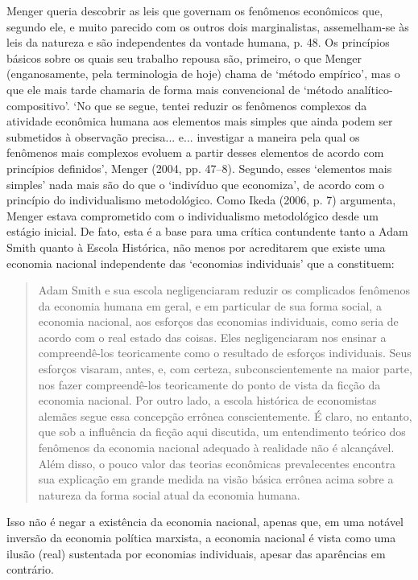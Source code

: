 \documentclass[12pt]{article}
\begin{document}
Menger queria descobrir as leis que governam os fenômenos econômicos que, segundo ele, e muito parecido com os outros dois marginalistas, assemelham-se às leis da natureza e são independentes da vontade humana, p. 48. Os princípios básicos sobre os quais seu trabalho repousa são, primeiro, o que Menger (enganosamente, pela terminologia de hoje) chama de ‘método empírico’, mas o que ele mais tarde chamaria de forma mais convencional de ‘método analítico-compositivo’. ‘No que se segue, tentei reduzir os fenômenos complexos da atividade econômica humana aos elementos mais simples que ainda podem ser submetidos à observação precisa... e... investigar a maneira pela qual os fenômenos mais complexos evoluem a partir desses elementos de acordo com princípios definidos’, Menger (2004, pp. 47–8). Segundo, esses ‘elementos mais simples’ nada mais são do que o ‘indivíduo que economiza’, de acordo com o princípio do individualismo metodológico. Como Ikeda (2006, p. 7) argumenta, Menger estava comprometido com o individualismo metodológico desde um estágio inicial. De fato, esta é a base para uma crítica contundente tanto a Adam Smith quanto à Escola Histórica, não menos por acreditarem que existe uma economia nacional independente das ‘economias individuais’ que a constituem:

\begin{quote}
Adam Smith e sua escola negligenciaram reduzir os complicados fenômenos da economia humana em geral, e em particular de sua forma social, a economia nacional, aos esforços das economias individuais, como seria de acordo com o real estado das coisas. Eles negligenciaram nos ensinar a compreendê-los teoricamente como o resultado de esforços individuais. Seus esforços visaram, antes, e, com certeza, subconscientemente na maior parte, nos fazer compreendê-los teoricamente do ponto de vista da ficção da economia nacional. Por outro lado, a escola histórica de economistas alemães segue essa concepção errônea conscientemente. É claro, no entanto, que sob a influência da ficção aqui discutida, um entendimento teórico dos fenômenos da economia nacional adequado à realidade não é alcançável. Além disso, o pouco valor das teorias econômicas prevalecentes encontra sua explicação em grande medida na visão básica errônea acima sobre a natureza da forma social atual da economia humana.
\end{quote}

Isso não é negar a existência da economia nacional, apenas que, em uma notável inversão da economia política marxista, a economia nacional é vista como uma ilusão (real) sustentada por economias individuais, apesar das aparências em contrário.
\end{document}
